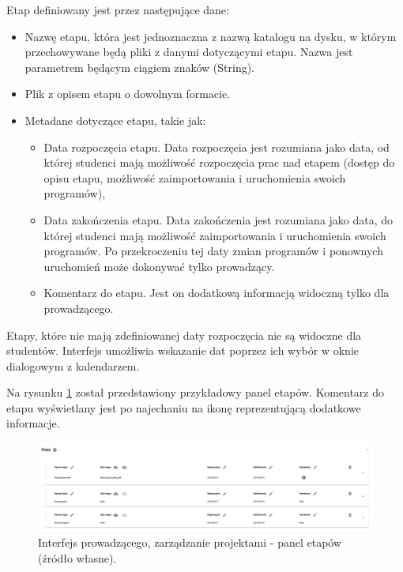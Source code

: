Etap definiowany jest przez następujące dane:
\begin {itemize}
    \item Nazwę etapu, która jest jednoznaczna z nazwą katalogu na dysku, w którym przechowywane będą pliki z danymi dotyczącymi etapu.
    Nazwa jest parametrem będącym ciągiem znaków (String).
    \item Plik z opisem etapu o dowolnym formacie.
    \item Metadane dotyczące etapu, takie jak:
    \begin {itemize}
        \item Data rozpoczęcia etapu.
        Data rozpoczęcia jest rozumiana jako data, od której studenci mają możliwość rozpoczęcia prac nad etapem (dostęp do opisu etapu, możliwość zaimportowania i uruchomienia swoich programów),
        \item Data zakończenia etapu.
        Data zakończenia jest rozumiana jako data, do której studenci mają możliwość zaimportowania i uruchomienia swoich programów.
        Po przekroczeniu tej daty zmian programów i ponownych uruchomień może dokonywać tylko prowadzący.
        \item Komentarz do etapu.
        Jest on dodatkową informacją widoczną tylko dla prowadzącego.
    \end{itemize}
\end {itemize}

Etapy, które nie mają zdefiniowanej daty rozpoczęcia nie są widoczne dla studentów.
Interfejs umożliwia wskazanie dat poprzez ich wybór w oknie dialogowym z kalendarzem.

Na rysunku \ref{fig:lecturer_stages} został przedstawiony przykładowy panel etapów.
Komentarz do etapu wyświetlany jest po najechaniu na ikonę reprezentującą dodatkowe informacje.

\begin{figure}[h]
    \centering
    \includegraphics[width = 15cm]{chapter04/lecturer_stages.png}
    \caption{Interfejs prowadzącego, zarządzanie projektami - panel etapów (źródło własne).}
    \label{fig:lecturer_stages}
\end{figure}

